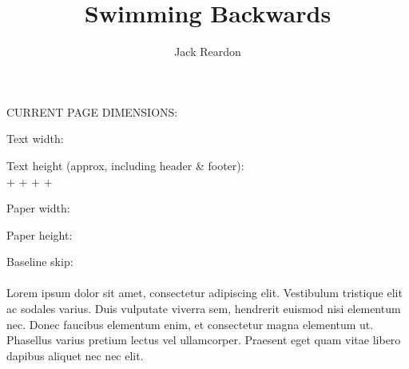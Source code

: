 \documentclass{scrbook}
\author{Jack Reardon}
\title{Swimming Backwards}
\date{}
\begin{document}
\maketitle

\begin{center}\Large
\vspace*{2em}
CURRENT PAGE DIMENSIONS:
\medskip

Text width: \Convert[unit=cm]{\the\textwidth}

\medskip
Text height (approx, including header \& footer):\\
{\large
\Convert[unit=cm]{\the\textheight} + \Convert[unit=cm]{\the\headheight} +
\Convert[unit=cm]{\the\headsep}  + \Convert[unit=cm]{\the\footskip} +
\Convert[unit=cm]{\the\topskip}}

\medskip
Paper width: \Convert[unit=cm]{\the\paperwidth}

\medskip
Paper height: \Convert[unit=cm]{\the\paperheight}

\medskip
Baseline skip: \\
\normalsize\the\baselineskip\\
Lorem ipsum dolor sit amet, consectetur adipiscing elit. Vestibulum tristique
elit ac sodales varius. Duis vulputate viverra sem, hendrerit euismod nisi
elementum nec. Donec faucibus elementum enim, et consectetur magna elementum ut.
Phasellus varius pretium lectus vel ullamcorper. Praesent eget quam vitae libero
dapibus aliquet nec nec elit.
\end{center}

\tableofcontents
\titlemark


\end{document}
